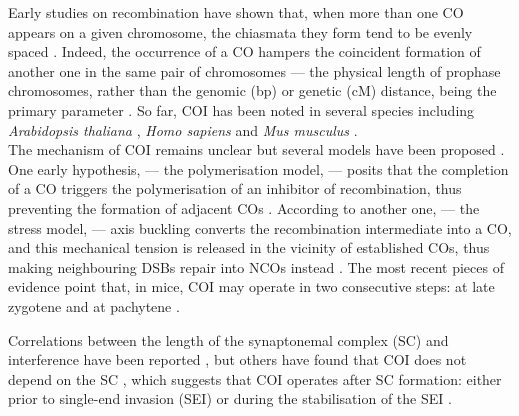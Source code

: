 Early studies on recombination \citep{sturtevant1915behavior,muller1916mechanism} have shown that, when more than one CO appears on a given chromosome, the chiasmata they form tend to be evenly spaced \citep{jones1967control, jones1974correlated, jones1984control,jones2006meiotic}.
Indeed, the occurrence of a CO hampers the coincident formation of another one in the same pair of chromosomes \citep{vanveen2003meiosis,hillers2004crossover} — the physical length of prophase chromosomes, rather than the genomic (bp) or genetic (cM) distance, being the primary parameter \citep{zhang2014crossover,wang2015meiotic}.
So far, COI has been noted in several species including \textit{Arabidopsis thaliana} \citep{drouaud2007sexspecific}, \textit{Homo sapiens} \citep{laurie1985further,broman2000characterization} and \textit{Mus musculus} \citep{lawrie1995chiasma,anderson1999distribution,broman2002crossover}.\\

The mechanism of COI remains unclear but several models have been proposed \citep[reviewed in][]{youds2011choice}.
One early hypothesis, — the polymerisation model, — posits that the completion of a CO triggers the polymerisation of an inhibitor of recombination, thus preventing the formation of adjacent COs \citep{maguire1988crossover,king1990polymerization}.
According to another one, — the stress model, — axis buckling converts the recombination intermediate into a CO, and this mechanical tension is released in the vicinity of established COs, thus making neighbouring DSBs repair into NCOs instead \citep{borner2004crossover,kleckner2004mechanical}.
The most recent pieces of evidence point that, in mice, COI may operate in two consecutive steps: at late zygotene and at pachytene \citep{boer2006two}.

Correlations between the length of the synaptonemal complex (SC) and interference have been reported \citep{sym1994crossover,lynn2002covariation,petkov2007crossover}, but others have found that COI does not depend on the SC \citep{deboer2007meiotic,shodhan2014msh4}, which suggests that COI operates after SC formation: either prior to single-end invasion (SEI) \citep{hunter2001singleend, bishop2004early} or during the stabilisation of the SEI \citep{shinohara2008crossover}.\\

